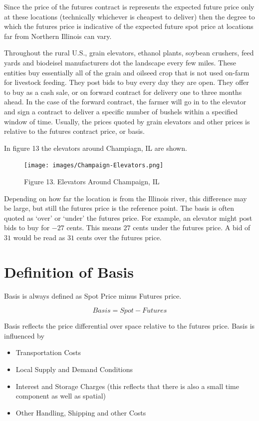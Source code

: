 \documentclass[
]{book}
\providecommand{\tightlist}{%
  \setlength{\itemsep}{0pt}\setlength{\parskip}{0pt}}
\begin{document}
Since the price of the futures contract is represents the expected future price only at these locations (technically whichever is cheapest to deliver) then the degree to which the futures price is indicative of the expected future spot price at locations far from Northern Illinois can vary.

Throughout the rural U.S., grain elevators, ethanol plants, soybean crushers, feed yards and biodeisel manufacturers dot the landscape every few miles. These entities buy essentially all of the grain and oilseed crop that is not used on-farm for livestock feeding. They post bids to buy every day they are open. They offer to buy as a cash sale, or on forward contract for delivery one to three months ahead. In the case of the forward contract, the farmer will go in to the elevator and sign a contract to deliver a specific number of bushels within a specified window of time. Usually, the prices quoted by grain elevators and other prices is relative to the futures contract price, or basis.

In figure 13 the elevators around Champiagn, IL are shown.

\begin{figure}
\centering
\texttt{[image: images/Champaign-Elevators.png]}
\caption{Figure 13. Elevators Around Champaign, IL}
\end{figure}

Depending on how far the location is from the Illinois river, this difference may be large, but still the futures price is the reference point. The basis is often quoted as `over' or `under' the futures price. For example, an elevator might post bids to buy for \(-27\) cents. This means \(27\) cents under the futures price. A bid of \(31\) would be read as \(31\) cents over the futures price.

\hypertarget{definition-of-basis}{%
\section{Definition of Basis}\label{definition-of-basis}}

Basis is always defined as Spot Price minus Futures price.

\[Basis = Spot - Futures\]

Basis reflects the price differential over space relative to the futures price. Basis is influenced by

\begin{itemize}
\tightlist
\item
  Transportation Costs
\item
  Local Supply and Demand Conditions
\item
  Interest and Storage Charges (this reflects that there is also a small time component as well as spatial)
\item
  Other Handling, Shipping and other Costs
\end{itemize}
\end{document}
